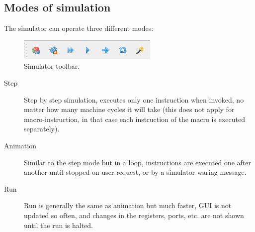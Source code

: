     \subsection{Modes of simulation}
        The simulator can operate three different modes:

        \begin{figure}[h!]
            \centering
            \includegraphics[width=.4\textwidth]{img/simulation_panel.png}
            \caption{Simulator toolbar.}
        \end{figure}

        \begin{description}
            \item [Step]
                Step by step simulation, executes only one instruction when invoked, no matter how many machine cycles it will take (this does not apply for macro-instruction, in that case each instruction of the macro is executed separately).
            \item [Animation]
                Similar to the step mode but in a loop, instructions are executed one after another until stopped on user request, or by a simulator waring message.
            \item [Run]
                Run is generally the same as animation but much faster, GUI is not updated so often, and changes in the registers, ports, etc. are not shown until the run is halted.
        \end{description}
